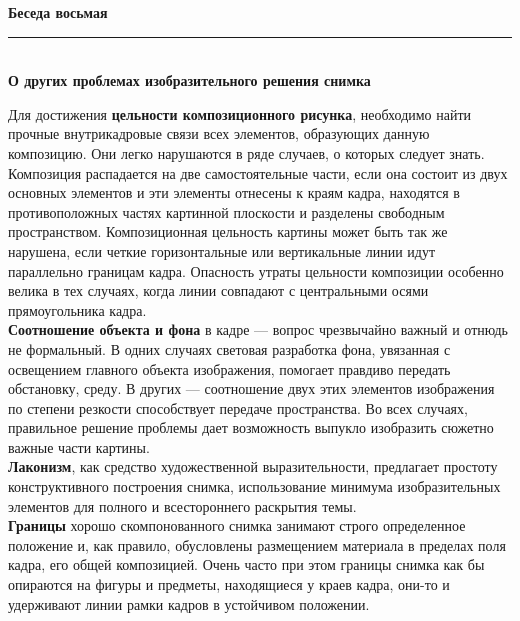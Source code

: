 \documentclass{article}
\renewcommand{\section}[2]{
	\vspace{2em}
	\begin{flushright}
		\Large
		\baselineskip=0.5\baselineskip
		\textbf{#1}
		\\
		\rule[0.5\baselineskip]{\textwidth}{0.15pt}
		\\
		\textbf{#2}
	\end{flushright}
}
\newcommand{\important}[1]{\textbf{#1}}
\begin{document}
\section{Беседа восьмая}{О других проблемах изобразительного решения снимка}
Для достижения \important{цельности композиционного рисунка}, необходимо найти прочные внутрикадровые связи всех элементов, образующих данную композицию. Они легко нарушаются в ряде случаев, о которых следует знать. Композиция распадается на две самостоятельные части, если она состоит из двух основных элементов и эти элементы отнесены к краям кадра, находятся в противоположных частях картинной плоскости и разделены свободным пространством. Композиционная цельность картины может быть так же нарушена, если четкие горизонтальные или вертикальные линии идут параллельно границам кадра. Опасность утраты цельности композиции особенно велика в тех случаях, когда линии совпадают с центральными осями прямоугольника кадра.\\
\important{Соотношение объекта и фона} в кадре --- вопрос чрезвычайно важный и отнюдь не формальный. В одних случаях световая разработка фона, увязанная с освещением главного объекта изображения, помогает правдиво передать обстановку, среду. В других --- соотношение двух этих элементов изображения по степени резкости способствует передаче пространства. Во всех случаях, правильное решение проблемы дает возможность выпукло изобразить сюжетно важные части картины.\\
\important{Лаконизм}, как средство художественной выразительности, предлагает простоту конструктивного построения снимка, использование минимума изобразительных элементов для полного и всестороннего раскрытия темы.\\
\important{Границы} хорошо скомпонованного снимка занимают строго определенное положение и, как правило, обусловлены размещением материала в пределах поля кадра, его общей композицией. Очень часто при этом границы снимка как бы опираются на фигуры и предметы, находящиеся у краев кадра, они-то и удерживают линии рамки кадров в устойчивом положении.
\end{document}
